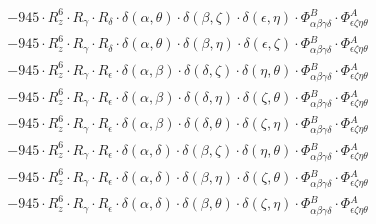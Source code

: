 \documentclass{article}
\begin{document}
\begin{equation}
\begin{array}{c}
 \\[0.2em] 		 - 945 \cdot R_{z}^{6} \cdot R_{\gamma{}} \cdot R_{\delta{}} \cdot \delta{}\left(\alpha{}, \theta{}\right) \cdot \delta{}\left(\beta{}, \zeta{}\right) \cdot \delta{}\left(\epsilon{}, \eta{}\right) \cdot \Phi{}^{B}_{\alpha{}\beta{}\gamma{}\delta{}} \cdot \Phi{}^{A}_{\epsilon{}\zeta{}\eta{}\theta{}} 
 \\[0.2em] 		 - 945 \cdot R_{z}^{6} \cdot R_{\gamma{}} \cdot R_{\delta{}} \cdot \delta{}\left(\alpha{}, \theta{}\right) \cdot \delta{}\left(\beta{}, \eta{}\right) \cdot \delta{}\left(\epsilon{}, \zeta{}\right) \cdot \Phi{}^{B}_{\alpha{}\beta{}\gamma{}\delta{}} \cdot \Phi{}^{A}_{\epsilon{}\zeta{}\eta{}\theta{}} 
 \\[0.2em] 		 - 945 \cdot R_{z}^{6} \cdot R_{\gamma{}} \cdot R_{\epsilon{}} \cdot \delta{}\left(\alpha{}, \beta{}\right) \cdot \delta{}\left(\delta{}, \zeta{}\right) \cdot \delta{}\left(\eta{}, \theta{}\right) \cdot \Phi{}^{B}_{\alpha{}\beta{}\gamma{}\delta{}} \cdot \Phi{}^{A}_{\epsilon{}\zeta{}\eta{}\theta{}} 
 \\[0.2em] 		 - 945 \cdot R_{z}^{6} \cdot R_{\gamma{}} \cdot R_{\epsilon{}} \cdot \delta{}\left(\alpha{}, \beta{}\right) \cdot \delta{}\left(\delta{}, \eta{}\right) \cdot \delta{}\left(\zeta{}, \theta{}\right) \cdot \Phi{}^{B}_{\alpha{}\beta{}\gamma{}\delta{}} \cdot \Phi{}^{A}_{\epsilon{}\zeta{}\eta{}\theta{}} 
 \\[0.2em] 		 - 945 \cdot R_{z}^{6} \cdot R_{\gamma{}} \cdot R_{\epsilon{}} \cdot \delta{}\left(\alpha{}, \beta{}\right) \cdot \delta{}\left(\delta{}, \theta{}\right) \cdot \delta{}\left(\zeta{}, \eta{}\right) \cdot \Phi{}^{B}_{\alpha{}\beta{}\gamma{}\delta{}} \cdot \Phi{}^{A}_{\epsilon{}\zeta{}\eta{}\theta{}} 
 \\[0.2em] 		 - 945 \cdot R_{z}^{6} \cdot R_{\gamma{}} \cdot R_{\epsilon{}} \cdot \delta{}\left(\alpha{}, \delta{}\right) \cdot \delta{}\left(\beta{}, \zeta{}\right) \cdot \delta{}\left(\eta{}, \theta{}\right) \cdot \Phi{}^{B}_{\alpha{}\beta{}\gamma{}\delta{}} \cdot \Phi{}^{A}_{\epsilon{}\zeta{}\eta{}\theta{}} 
 \\[0.2em] 		 - 945 \cdot R_{z}^{6} \cdot R_{\gamma{}} \cdot R_{\epsilon{}} \cdot \delta{}\left(\alpha{}, \delta{}\right) \cdot \delta{}\left(\beta{}, \eta{}\right) \cdot \delta{}\left(\zeta{}, \theta{}\right) \cdot \Phi{}^{B}_{\alpha{}\beta{}\gamma{}\delta{}} \cdot \Phi{}^{A}_{\epsilon{}\zeta{}\eta{}\theta{}} 
 \\[0.2em] 		 - 945 \cdot R_{z}^{6} \cdot R_{\gamma{}} \cdot R_{\epsilon{}} \cdot \delta{}\left(\alpha{}, \delta{}\right) \cdot \delta{}\left(\beta{}, \theta{}\right) \cdot \delta{}\left(\zeta{}, \eta{}\right) \cdot \Phi{}^{B}_{\alpha{}\beta{}\gamma{}\delta{}} \cdot \Phi{}^{A}_{\epsilon{}\zeta{}\eta{}\theta{}} 

\end{array}
\end{equation}
\end{document}
